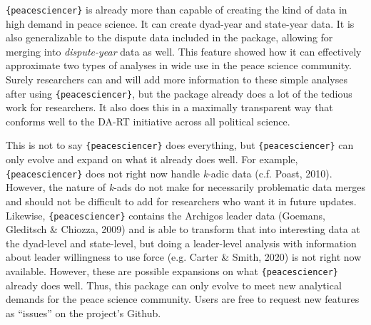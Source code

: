 \documentclass[
  11pt,
]{article}
\begin{document}
\texttt{\{peacesciencer\}} is already more than capable of creating the kind of data in high demand in peace science. It can create dyad-year and state-year data. It is also generalizable to the dispute data included in the package, allowing for merging into \emph{dispute-year} data as well. This feature showed how it can effectively approximate two types of analyses in wide use in the peace science community. Surely researchers can and will add more information to these simple analyses after using \texttt{\{peacesciencer\}}, but the package already does a lot of the tedious work for researchers. It also does this in a maximally transparent way that conforms well to the DA-RT initiative across all political science.

This is not to say \texttt{\{peacesciencer\}} does everything, but \texttt{\{peacesciencer\}} can only evolve and expand on what it already does well. For example, \texttt{\{peacesciencer\}} does not right now handle \emph{k}-adic data (c.f. Poast, 2010). However, the nature of \emph{k}-ads do not make for necessarily problematic data merges and should not be difficult to add for researchers who want it in future updates. Likewise, \texttt{\{peacesciencer\}} contains the Archigos leader data (Goemans, Gleditsch \& Chiozza, 2009) and is able to transform that into interesting data at the dyad-level and state-level, but doing a leader-level analysis with information about leader willingness to use force (e.g. Carter \& Smith, 2020) is not right now available. However, these are possible expansions on what \texttt{\{peacesciencer\}} already does well. Thus, this package can only evolve to meet new analytical demands for the peace science community. Users are free to request new features as ``issues'' on the project's Github.
\end{document}
